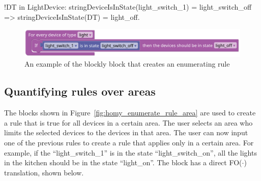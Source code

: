 \documentclass[11pt,a4paper]{report}
\newcommand{\fodot}{FO($\cdot$)\xspace}
\begin{document}
\begin{idplisting}
!DT in LightDevice: stringDeviceIsInState(light_switch_1) = light_switch_off =>
stringDeviceIsInState(DT) = light_off.
\end{idplisting}

\begin{figure}
    \centering
    \includegraphics[width=0.8\linewidth]{images/homy_enumerate_rule_devicetype.png}
    \caption{An example of the blockly block that creates an enumerating rule}
    \label{fig:homy_enumerate_rule_devicetype}
\end{figure}

\subsection{Quantifying rules over areas}
The blocks shown in Figure~\ref{fig:homy_enumerate_rule_area} are used to create a rule that is true for all devices in a certain area. The user selects an area who limits the selected devices to the devices in that area. The user can now input one of the previous rules to create a rule that applies only in a certain area. For example, if the ``light\_switch\_1'' is in the state ``light\_switch\_on'', all the lights in the kitchen should be in the state ``light\_on''. The block has a direct \fodot translation, shown below.
\end{document}
